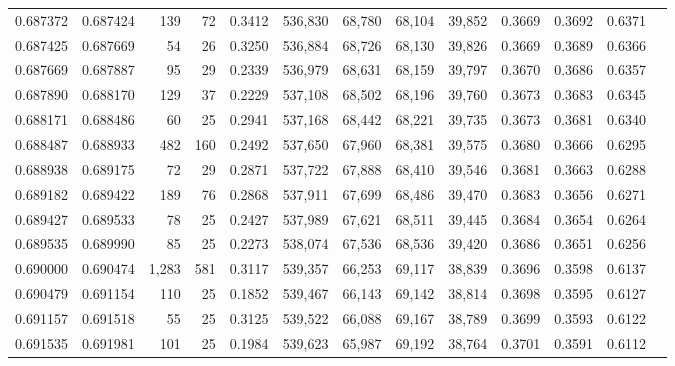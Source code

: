 \begin{tabular}{rrrrrrrrrrrrr}
0.687372 & 0.687424 &   139 &  72 &                                     0.3412 & 536,830 &  68,780 &  68,104 &  39,852 & 0.3669 & 0.3692 & 0.6371 \\
0.687425 & 0.687669 &    54 &  26 &                                     0.3250 & 536,884 &  68,726 &  68,130 &  39,826 & 0.3669 & 0.3689 & 0.6366 \\
0.687669 & 0.687887 &    95 &  29 &                                     0.2339 & 536,979 &  68,631 &  68,159 &  39,797 & 0.3670 & 0.3686 & 0.6357 \\
0.687890 & 0.688170 &   129 &  37 &                                     0.2229 & 537,108 &  68,502 &  68,196 &  39,760 & 0.3673 & 0.3683 & 0.6345 \\
0.688171 & 0.688486 &    60 &  25 &                                     0.2941 & 537,168 &  68,442 &  68,221 &  39,735 & 0.3673 & 0.3681 & 0.6340 \\
0.688487 & 0.688933 &   482 & 160 &                                     0.2492 & 537,650 &  67,960 &  68,381 &  39,575 & 0.3680 & 0.3666 & 0.6295 \\
0.688938 & 0.689175 &    72 &  29 &                                     0.2871 & 537,722 &  67,888 &  68,410 &  39,546 & 0.3681 & 0.3663 & 0.6288 \\
0.689182 & 0.689422 &   189 &  76 &                                     0.2868 & 537,911 &  67,699 &  68,486 &  39,470 & 0.3683 & 0.3656 & 0.6271 \\
0.689427 & 0.689533 &    78 &  25 &                                     0.2427 & 537,989 &  67,621 &  68,511 &  39,445 & 0.3684 & 0.3654 & 0.6264 \\
0.689535 & 0.689990 &    85 &  25 &                                     0.2273 & 538,074 &  67,536 &  68,536 &  39,420 & 0.3686 & 0.3651 & 0.6256 \\
0.690000 & 0.690474 & 1,283 & 581 &                                     0.3117 & 539,357 &  66,253 &  69,117 &  38,839 & 0.3696 & 0.3598 & 0.6137 \\
0.690479 & 0.691154 &   110 &  25 &                                     0.1852 & 539,467 &  66,143 &  69,142 &  38,814 & 0.3698 & 0.3595 & 0.6127 \\
0.691157 & 0.691518 &    55 &  25 &                                     0.3125 & 539,522 &  66,088 &  69,167 &  38,789 & 0.3699 & 0.3593 & 0.6122 \\
0.691535 & 0.691981 &   101 &  25 &                                     0.1984 & 539,623 &  65,987 &  69,192 &  38,764 & 0.3701 & 0.3591 & 0.6112 \\

\end{tabular}
